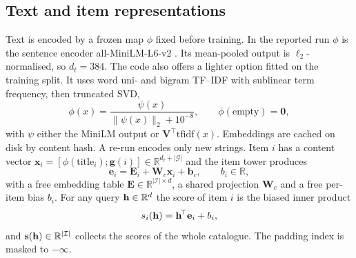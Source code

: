 \subsection{Text and item representations}
Text is encoded by a frozen map $\phi$ fixed before training. In the reported run $\phi$ is the sentence encoder all-MiniLM-L6-v2 \cite{reimers2019sbert}. Its mean-pooled output is $\ell_2$-normalised, so $d_t=384$. The code also offers a lighter option fitted on the training split. It uses word uni- and bigram TF--IDF with sublinear term frequency, then truncated SVD,
\begin{equation}
  \label{eq:text}
  \phi(x)=\frac{\psi(x)}{\lVert\psi(x)\rVert_2+10^{-8}},\qquad \phi(\text{empty})=\mathbf{0},
\end{equation}
with $\psi$ either the MiniLM output or $\mathbf{V}^{\!\top}\mathrm{tfidf}(x)$. Embeddings are cached on disk by content hash. A re-run encodes only new strings.
Item $i$ has a content vector $\mathbf{x}_i=[\phi(\text{title}_i);\mathbf{g}(i)]\in\mathbb{R}^{d_t+|\mathcal{G}|}$ and the item tower produces
\begin{equation}
  \label{eq:item}
  \mathbf{e}_i=\mathbf{E}_{i}+\mathbf{W}_{\!c}\mathbf{x}_i+\mathbf{b}_c,\qquad b_i\in\mathbb{R},
\end{equation}
with a free embedding table $\mathbf{E}\in\mathbb{R}^{|\mathcal{I}|\times d}$, a shared projection $\mathbf{W}_{\!c}$ and a free per-item bias $b_i$. For any query $\mathbf{h}\in\mathbb{R}^{d}$ the score of item $i$ is the biased inner product
\begin{equation}
  \label{eq:score}
  s_i(\mathbf{h})=\mathbf{h}^{\!\top}\mathbf{e}_i+b_i ,
\end{equation}
and $\mathbf{s}(\mathbf{h})\in\mathbb{R}^{|\mathcal{I}|}$ collects the scores of the whole catalogue. The padding index is masked to $-\infty$.

